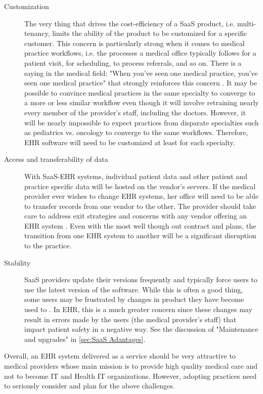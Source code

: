 \documentclass[10pt]{article}
\begin{document}
\begin{description}
\item[Customization]
The very thing that drives the cost-efficiency of a SaaS product, i.e. multi-tenancy, limits the ability of the product to be customized for a specific customer.
This concern is particularly strong when it comes to medical practice workflows, i.e. the processes a medical office typically follows for a patient visit, for scheduling, to process referrals, and so on.
There is a saying in the medical field: "When you've seen one medical practice, you've seen one medical practice" that strongly reinforces this concern \cite{health-hack}.
It may be possible to convince medical practices in the same specialty to converge to a more or less similar workflow even though it will involve retraining nearly every member of the provider's staff, including the doctors. 
However, it will be nearly impossible to expect practices from disparate specialties such as pediatrics vs. oncology to converge to the same workflows.
Therefore, EHR software will need to be customized at least for each specialty.

\item[Access and transferability of data]
With SaaS-EHR systems, individual patient data and other patient and practice specific data will be hosted on the vendor's servers.
If the medical provider ever wishes to change EHR systems, her office will need to be able to transfer records from one vendor to the other.
The provider should take care to address exit strategies and concerns with any vendor offering an EHR system \cite{ehr-breakup}.
Even with the most well though out contract and plans, the transition from one EHR system to another will be a significant disruption to the practice.

\item[Stability]
SaaS providers update their versions frequently and typically force users to use the latest version of the software.
While this is often a good thing, some users may be frustrated by changes in product they have become used to \cite{wiki-saas}.
In EHR, this is a much greater concern since these changes may result in errors made by the users (the medical provider's staff) that impact patient safety in a negative way.
See the discussion of "Maintenance and upgrades" in \ref{sec:SaaS Adantages}.

\end{description}

Overall, an EHR system delivered as a service should be very attractive to medical providers whose main mission is to provide high quality medical care and not to become IT and Health IT organizations.
However, adopting practices need to seriously consider and plan for the above challenges.
\end{document}
